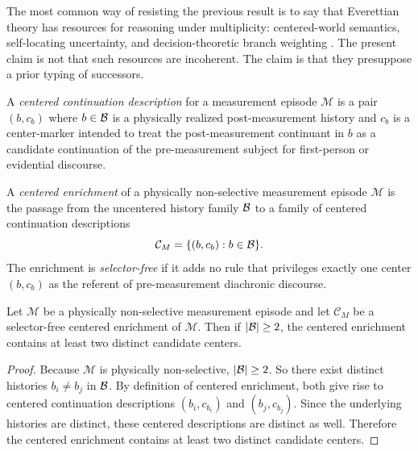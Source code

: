 The most common way of resisting the previous result is to say that Everettian theory has resources for
reasoning under multiplicity: centered-world semantics, self-locating uncertainty, and
decision-theoretic branch weighting \citep{lewis1979,greaves2004,sebenscarroll2018}. The present claim is not that such resources are incoherent. The claim is that they presuppose a prior typing of successors.

\begin{definition}
A \emph{centered continuation description} for a measurement episode $\mathcal{M}$ is a pair
$(b,c_b)$ where $b\in\mathcal{B}$ is a physically realized post-measurement history and $c_b$ is a center-marker
intended to treat the post-measurement continuant in $b$ as a candidate continuation of the
pre-measurement subject for first-person or evidential discourse.
\end{definition}

\begin{definition}
A \emph{centered enrichment} of a physically non-selective measurement episode $\mathcal{M}$ is the
passage from the uncentered history family $\mathcal{B}$ to a family of centered continuation descriptions
\[
\mathcal{C}_M=\{(b,c_b): b\in\mathcal{B}\}.
\]
The enrichment is \emph{selector-free} if it adds no rule that privileges exactly one center $(b,c_b)$ as
the referent of pre-measurement diachronic discourse.
\end{definition}

\begin{lemma}
\label{lem:centered_preserves}
Let $\mathcal{M}$ be a physically non-selective measurement episode and let $\mathcal{C}_M$ be a
selector-free centered enrichment of $\mathcal{M}$. Then if $|\mathcal{B}|\ge 2$, the centered enrichment
contains at least two distinct candidate centers.
\end{lemma}

\begin{proof}
Because $\mathcal{M}$ is physically non-selective, $|\mathcal{B}|\ge 2$. So there exist distinct histories
$b_i\neq b_j$ in $\mathcal{B}$. By definition of centered enrichment, both give rise to centered continuation
descriptions $(b_i,c_{b_i})$ and $(b_j,c_{b_j})$. Since the underlying histories are distinct, these
centered descriptions are distinct as well. Therefore the centered enrichment contains at least two
distinct candidate centers.
\end{proof}

